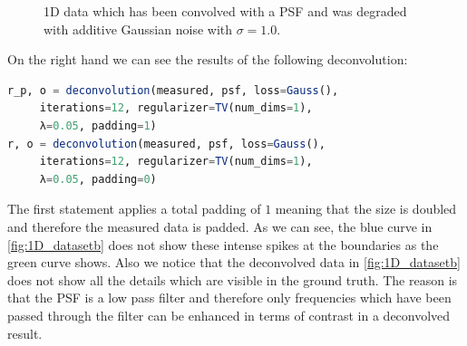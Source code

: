 \documentclass{juliacon}
\begin{document}
\begin{figure}[H]
\begin{subfigure}[b]{.25\textwidth}
                \caption{}
                \label{fig:1D_datasetb}
            \end{subfigure}
            \caption{1D data which has been convolved with a PSF and was degraded with additive Gaussian noise with $\sigma=1.0$.}
            \label{fig:1D_dataset}
        \end{figure}
        On the right hand we can see the results of the following deconvolution:
        \begin{lstlisting}[language=Julia]
r_p, o = deconvolution(measured, psf, loss=Gauss(),
     iterations=12, regularizer=TV(num_dims=1),
     λ=0.05, padding=1)
r, o = deconvolution(measured, psf, loss=Gauss(), 
     iterations=12, regularizer=TV(num_dims=1),
     λ=0.05, padding=0)
        \end{lstlisting}
    The first statement applies a total padding of $1$ meaning that the size is doubled and therefore the measured data is padded.
    As we can see, the blue curve in \autoref{fig:1D_datasetb} does not show these intense spikes at the boundaries as the green curve shows.
    Also we notice that the deconvolved data in \autoref{fig:1D_datasetb} does not show all the details which are visible in the ground truth.
    The reason is that the PSF is a low pass filter and therefore only frequencies which have been passed through the filter 
    can be enhanced in terms of contrast in a deconvolved result.
\end{document}
